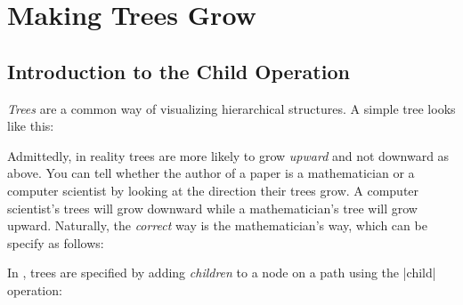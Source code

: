 %
%
%

\section{Making Trees Grow}

\label{section-trees}


\subsection{Introduction to the  Child Operation}

\emph{Trees} are a common way of visualizing hierarchical
structures. A simple tree looks like this:
\begin{codeexample}[]
\end{codeexample}

Admittedly, in reality trees are more likely to grow \emph{upward} and
not downward as above. You can tell whether the author of a paper is a
mathematician or a computer scientist by looking at the direction
their trees grow. A computer scientist's trees will grow downward
while a mathematician's tree will grow upward. Naturally, the
\emph{correct} way is the mathematician's way, which can be specify as
follows: 
\begin{codeexample}[]
\end{codeexample}

In \tikzname, trees are specified by adding \emph{children} to a
node on a path using the |child| operation:

